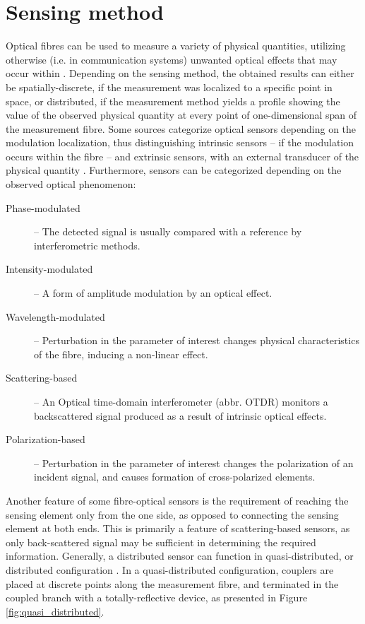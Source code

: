 \documentclass{standalone}
\begin{document}
\chapter{Sensing method} \label{ch:sensing_method}
\setcounter{page}\thestranica


Optical fibres can be used to measure a variety of physical quantities, utilizing otherwise (i.e. in communication systems) unwanted optical effects that may occur within \cite{krohnFundamentals}. Depending on the sensing method, the obtained results can either be spatially-discrete, if the measurement was localized to a specific point in space, or distributed, if the measurement method yields a profile showing the value of the observed physical quantity at every point of one-dimensional span of the measurement fibre. Some sources categorize optical sensors depending on the modulation localization, thus distinguishing intrinsic sensors -- if the modulation occurs within the fibre -- and extrinsic sensors, with an external transducer of the physical quantity \cite{mitschke2010fiber}. Furthermore, sensors can be categorized depending on the observed optical phenomenon:
\begin{description}
	\item[Phase-modulated] -- The detected signal is usually compared with a reference by interferometric methods.
	\item[Intensity-modulated] -- A form of amplitude modulation by an optical effect.
	\item[Wavelength-modulated] -- Perturbation in the parameter of interest changes physical characteristics of the fibre, inducing a non-linear effect.
	\item[Scattering-based] -- An Optical time-domain interferometer (abbr. OTDR) monitors a backscattered signal produced as a result of intrinsic optical effects.
	\item[Polarization-based] -- Perturbation in the parameter of interest changes the polarization of an incident signal, and causes formation of cross-polarized elements.
\end{description}
Another feature of some fibre-optical sensors is the requirement of reaching the sensing element only from the one side, as opposed to connecting the sensing element at both ends. This is primarily a feature of scattering-based sensors, as only back-scattered signal may be sufficient in determining the required information. Generally, a distributed sensor can function in quasi-distributed, or distributed configuration \cite{Rogers1999}. In a quasi-distributed configuration, couplers are placed at discrete points along the measurement fibre, and terminated in the coupled branch with a totally-reflective device, as presented in Figure \ref{fig:quasi_distributed}.
\end{document}
